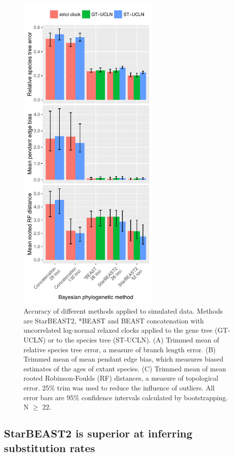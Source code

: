 \documentclass[nogrid]{MBE}%
\begin{document}
\begin{figure}[htb!]
\centering
\includegraphics[width=70mm]{tree_error_phased.pdf}
\caption
{Accuracy of different methods applied to simulated data. Methods are StarBEAST2,
*BEAST and BEAST concatenation with uncorrelated log-normal relaxed clocks applied
to the gene tree (GT-UCLN) or to the species tree (ST-UCLN). (A) Trimmed mean of
relative species tree error, a measure of branch length error. (B) Trimmed
mean of mean pendant edge bias, which measures biased estimates of the ages of
extant species. (C) Trimmed mean of mean rooted Robinson-Foulds (RF) distances, a
measure of topological error. 25\% trim was used to reduce the
influence of outliers. All error bars are 95\% confidence intervals calculated
by bootstrapping. N $\ge$ 22.}
\label{fig:speciesTreeError}
\end{figure}

\subsection{StarBEAST2 is superior at inferring substitution rates}
\end{document}
